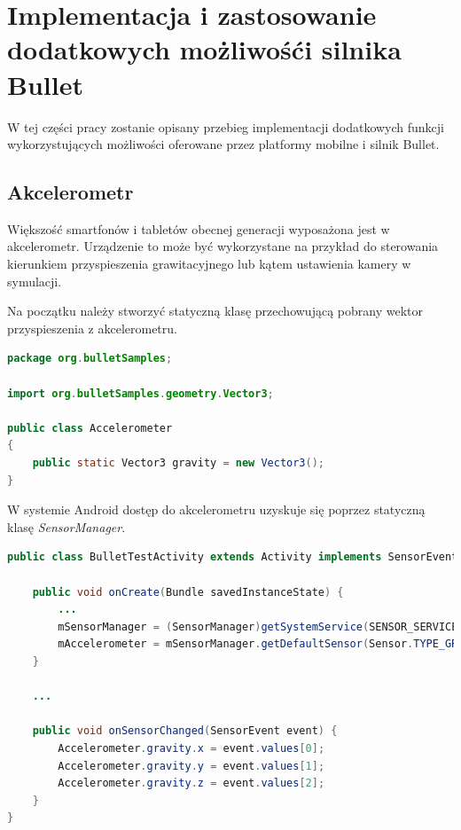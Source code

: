 \newpage
\section{Implementacja i zastosowanie dodatkowych możliwośći silnika Bullet}
W tej części pracy zostanie opisany przebieg implementacji dodatkowych funkcji
wykorzystujących możliwości oferowane przez platformy mobilne i silnik Bullet.

\subsection{Akcelerometr}
Większość smartfonów i tabletów obecnej generacji wyposażona jest w
akcelerometr. Urządzenie to może być wykorzystane na przykład do sterowania
kierunkiem przyspieszenia grawitacyjnego lub kątem ustawienia kamery w
symulacji.

Na początku należy stworzyć statyczną klasę przechowującą pobrany wektor
przyspieszenia z akcelerometru.

\begin{lstlisting}[language=java, caption=Klasa Accelerometer przechowująca
dane pobrane z akcelerometru.]
package org.bulletSamples;
 
import org.bulletSamples.geometry.Vector3;
 
public class Accelerometer
{
	public static Vector3 gravity = new Vector3();
}
\end{lstlisting}

W systemie Android dostęp do akcelerometru uzyskuje się poprzez statyczną klasę
\emph{SensorManager}.

\begin{lstlisting}[language=java, caption=Pobranie wektora przyspieszenia z
akcelerometru.] public class BulletTestActivity extends Activity implements SensorEventListener {

	public void onCreate(Bundle savedInstanceState) {
		...
		mSensorManager = (SensorManager)getSystemService(SENSOR_SERVICE);
		mAccelerometer = mSensorManager.getDefaultSensor(Sensor.TYPE_GRAVITY);
    }
    
	...
    
    public void onSensorChanged(SensorEvent event) {
		Accelerometer.gravity.x = event.values[0];
		Accelerometer.gravity.y = event.values[1];
		Accelerometer.gravity.z = event.values[2];
	}
}
\end{lstlisting}

